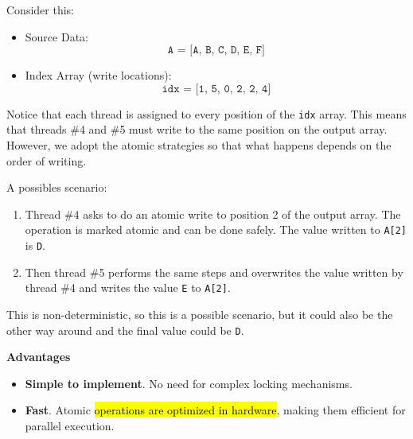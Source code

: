 \highspace
\begin{examplebox}
    Consider this:
    \begin{itemize}
        \item Source Data:
        \begin{equation*}
            \texttt{A = [A, B, C, D, E, F]}
        \end{equation*}
        \item Index Array (write locations):
        \begin{equation*}
            \texttt{idx = [1, 5, 0, 2, 2, 4]}
        \end{equation*}
    \end{itemize}
    Notice that each thread is assigned to every position of the \texttt{idx} array. This means that threads \#4 and \#5 must write to the same position on the output array. However, we adopt the atomic strategies so that what happens depends on the order of writing.

    \highspace
    A possibles scenario:
    \begin{enumerate}
        \item Thread \#4 asks to do an atomic write to position 2 of the output array. The operation is marked atomic and can be done safely. The value written to \texttt{A[2]} is \texttt{D}.
        \item Then thread \#5 performs the same steps and overwrites the value written by thread \#4 and writes the value \texttt{E} to \texttt{A[2]}.
    \end{enumerate}
    This is non-deterministic, so this is a possible scenario, but it could also be the other way around and the final value could be \texttt{D}.
\end{examplebox}

\newpage

\begin{flushleft}
    \textcolor{Green3}{ \textbf{Advantages}}
\end{flushleft}
\begin{itemize}[label=\textcolor{Green3}{}]
    \item \textcolor{Green3}{\textbf{Simple to implement}}. No need for complex locking mechanisms.
    \item \textcolor{Green3}{\textbf{Fast}}. Atomic \hl{operations are optimized in hardware}, making them efficient for parallel execution.
\end{itemize}

